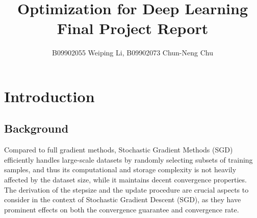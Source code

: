 \documentclass[14pt,onecolumn,letterpaper]{extarticle}
\begin{document}
\raggedbottom
\title{Optimization for Deep Learning Final Project Report}
\author{B09902055 Weiping Li, B09902073 Chun-Neng Chu}
\date{}
\maketitle












\section{Introduction}
\subsection{Background}
Compared to full gradient methods, Stochastic Gradient Methods (SGD) efficiently handles large-scale datasets by randomly selecting subsets of training samples, and thus its computational and storage complexity is not heavily affected by the dataset size, while it maintains decent convergence properties. The derivation of the stepsize and the update procedure are crucial aspects to consider in the context of Stochastic Gradient Descent (SGD), as they have prominent effects on both the convergence guarantee and convergence rate.
\end{document}
